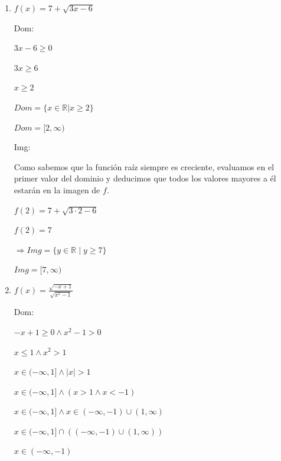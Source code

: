 \documentclass{article}
\begin{document}
\begin{enumerate}
\begin{enumerate}
        $Img = \{y \,|\, y \in \mathbb{R}\}$
        
        $Img = \mathbb{R}$
        \vspace{\baselineskip}
        
        \item[e)]\(f(x) = 7 + \sqrt{3x - 6}\)

        Dom:

        $3x - 6 \geq 0$

        $3x \geq 6$

        $x \geq 2$
        \vspace{\baselineskip}

        $Dom = \{x \in \mathbb{R} | x \geq 2\}$

        $Dom = [2, \infty)$
        \vspace{\baselineskip}

        Img:
        
        Como sabemos que la función raíz siempre es creciente, evaluamos en el primer valor del dominio y deducimos que todos los valores mayores a él estarán en la imagen de \(f\).
        \vspace{\baselineskip}

        $f(2) = 7 + \sqrt{3 \cdot 2 - 6}$

        $f(2) = 7$
        \vspace{\baselineskip}

        $\Rightarrow Img = \{y \in \mathbb{R} \mid y \geq 7\}$

        $Img = [7, \infty)$
        \vspace{\baselineskip}
        
        \item[f)]\(f(x) = \frac{\sqrt{-x+1}}{\sqrt{x^2-1}}\)

        Dom:

        $-x + 1 \geq 0 \land x^2 - 1 > 0$

        $x \leq 1 \land x^2 > 1$

        $x \in (-\infty, 1] \land \lvert x \rvert > 1$

        $x \in (-\infty, 1] \land (x > 1 \land x < -1)$

        $x \in (-\infty, 1] \land x \in (-\infty, -1) \cup (1, \infty)$

        $x \in (-\infty, 1] \cap ((-\infty, -1) \cup (1, \infty))$

        $x \in (-\infty, -1)$
        \vspace{\baselineskip}


\end{enumerate}
\end{enumerate}
\end{document}
